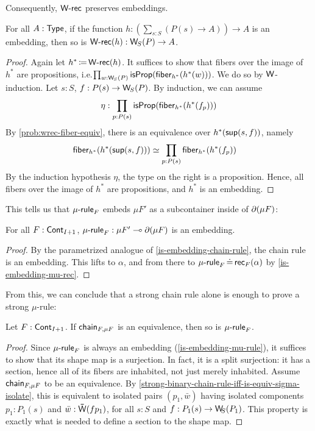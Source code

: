 Consequently, \( \operatorname{\mathsf{W-rec}} \) preserves embeddings.
\begin{lemma}\label{is-embedding-W-rec}
  For all \( A : \operatorname{\mathsf{Type}} \),
  if the function \( { h : ( \sum_{s : S} (P(s) \to A) ) \to A } \) is an embedding,
  then so is \( \WRec(h) : \W_{S}(P) \to A \).
  \begin{proof}
    Again let \( h^* \operatorname{\mathrel{\coloneq}} \operatorname{\mathsf{W-rec}}(h) \).
    It suffices to show that fibers over the image of \( h^* \) are propositions,
    i.e.\@ \( \prod_{w : \W_{S}(P)} \Op{isProp}(\Fiber_{h^*}(h^*(w)))  \).
    We do so by \( \W \)-induction.
    Let \( s : S \), \( f : P(s) \to \W_{S}(P) \).
    By induction, we can assume
    \[
      \eta : \prod_{p : P(s)} \mathsf{isProp}(\operatorname{\mathsf{fiber}}_{h^*}(h^*(f_p)))
    \]
    By \autoref{prob:wrec-fiber-equiv}, there is an equivalence over \( h^*(\operatorname{\mathsf{sup}}(s, f)) \), namely
    \begin{align*}
      \operatorname{\mathsf{fiber}}_{h^*}(h^*(\operatorname{\mathsf{sup}}(s, f)))
        &\simeq
          \prod_{p : P(s)}
            \operatorname{\mathsf{fiber}}_{h^*}(h^*(f_p))
    \end{align*}
    By the induction hypothesis \( \eta \), the type on the right is a proposition.
    Hence, all fibers over the image of \( h^* \) are propositions,
    and \( h^* \) is an embedding.
  \end{proof}
\end{lemma}

This tells us that \( \operatorname{\mathsf{\mu-rule}}_F \) embeds \( \mu F' \) as a subcontainer inside of \( \partial(\mu F) \):
\begin{lemma}\label{is-embedding-mu-rule}
  For all \( F : \operatorname{\mathsf{Cont}}_{I + 1} \), \( \operatorname{\mathsf{\mu-rule}}_F : \mu F'\mathrel{\multimap}\partial(\mu F) \) is an embedding.
  \begin{proof}
    By the parametrized analogue of \autoref{is-embedding-chain-rule}, the chain rule is an embedding.
    This lifts to \( \alpha \), and from there to \( \operatorname{\mathsf{\mu-rule}}_F \operatorname{\mathrel{\doteq}} \operatorname{\mathsf{rec}}_F(\alpha) \) by \autoref{is-embedding-mu-rec}.
  \end{proof}
\end{lemma}

From this, we can conclude that a strong chain rule alone is enough to prove a strong \( \mu \)-rule:
\begin{proposition}\label{strong-chain-rule-to-strong-mu-rule}
  Let \( F : \operatorname{\mathsf{Cont}}_{I + 1} \).
  If  \( \operatorname{\mathsf{chain}}_{F,{\mu F}} \) is an equivalence, then so is \( \operatorname{\mathsf{\mu-rule}}_F \).
  \begin{proof}
    Since \( \operatorname{\mathsf{\mu-rule}}_F \) is always an embedding (\autoref{is-embedding-mu-rule}),
    it suffices to show that its shape map is a surjection.
    In fact, it is a split surjection: it has a section, hence all of its fibers are inhabited, not just merely inhabited.
    Assume \( \operatorname{\mathsf{chain}}_{F,{\mu F}} \) to be an equivalence.
    By \autoref{strong-binary-chain-rule-iff-is-equiv-sigma-isolate}, this is equivalent to isolated pairs
    \( (p_1, \bar{w}) \)
    having isolated components \( p_1 : P_1(s) \) and \( \bar{w} : \WPath(f{p_1}) \),
    for all \( s : S \) and \( f : P_1(s) \to \W_{\!S}(P_1) \).
    This property is exactly what is needed to define a section to the shape map.
  \end{proof}
\end{proposition}


